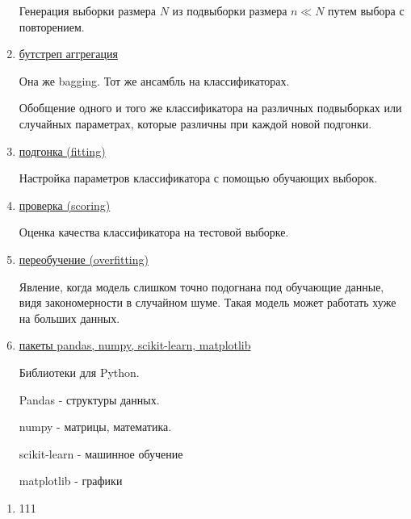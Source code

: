 \documentclass{proc}
\begin{document}
\begin{enumerate}
		Генерация выборки размера $N$ из подвыборки размера $n \ll N$ путем выбора с повторением.
		
		\item \uline{бутстреп аггрегация}
		
		Она же bagging. Тот же ансамбль на классификаторах.
		
		Обобщение одного и того же классификатора на различных подвыборках или случайных параметрах, которые различны при каждой новой подгонки.
		
		\item \uline{подгонка (fitting)}
		
		Настройка параметров классификатора с помощью обучающих выборок.
		
		\item \uline{проверка (scoring)}
		
		Оценка качества классификатора на тестовой выборке.
		
		\item \uline{переобучение (overfitting)}
		
		Явление, когда модель слишком точно подогнана под обучающие данные, видя закономерности в случайном шуме. Такая модель может работать хуже на больших данных.
		
		\item \uline{пакеты pandas, numpy, scikit-learn, matplotlib}
		
		Библиотеки для Python.
		
		Pandas - структуры данных.
		
		numpy - матрицы, математика.
		
		scikit-learn - машинное обучение
		
		matplotlib - графики
	\end{enumerate}
	
	\begin{enumerate}
		
		\item 111
		
		
	\end{enumerate}
	
\end{document}
